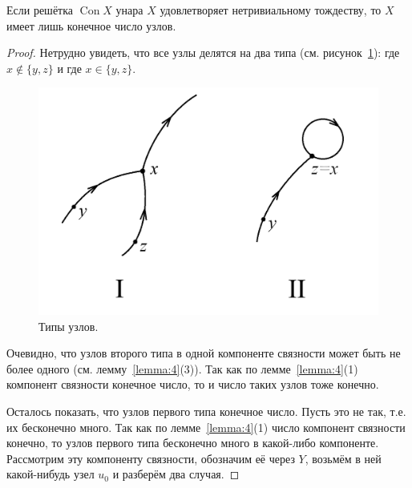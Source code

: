 \documentclass[11pt,twoside,final
]{article}
\def\Con{\operatorname{Con}}
\begin{document}
\begin{lemma} \label{lemma:6}
	Если решётка $\Con X$ унара $X$ удовлетворяет нетривиальному тождеству, то $X$ имеет лишь конечное число узлов.
\end{lemma}
\begin{proof}
	Нетрудно увидеть, что все узлы делятся на два типа (см. рисунок~\ref{fig:uzly_1}): где $x \notin \{ y, z \}$ и где $x \in \{ y, z \}$.
	\begin{figure}[ht!]
		\centering
		\includegraphics[scale=0.4]{img/uzly_1.png}
		\caption{Типы узлов.}
		\label{fig:uzly_1}
	\end{figure}
	Очевидно, что узлов второго типа в одной компоненте связности может быть не более одного (см. лемму~\ref{lemma:4}(3)).
	Так как по лемме~\ref{lemma:4}(1) компонент связности конечное число, то и число таких узлов тоже конечно.

	Осталось показать, что узлов первого типа конечное число.
	Пусть это не так, т.е. их бесконечно много.
	Так как по лемме~\ref{lemma:4}(1) число компонент связности конечно, то узлов первого типа бесконечно много в какой-либо компоненте.
	Рассмотрим эту компоненту связности, обозначим её через $Y$, возьмём в ней какой-нибудь узел $u_0$ и разберём два случая.


\end{proof}
\end{document}

